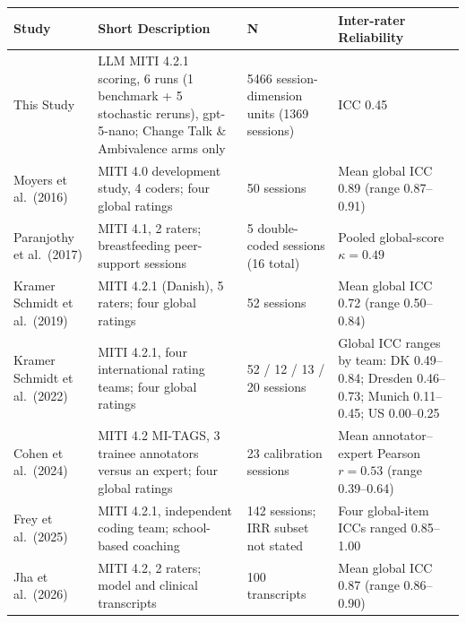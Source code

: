 \begin{tabular}{p{3.2cm} p{5.4cm} p{3.0cm} p{4.4cm}}
\toprule
\textbf{Study} & \textbf{Short Description} & \textbf{N} & \textbf{Inter-rater Reliability} \\
\midrule
This Study & LLM MITI 4.2.1 scoring, 6 runs (1 benchmark + 5 stochastic reruns), gpt-5-nano; Change Talk \& Ambivalence arms only & 5466 session-dimension units (1369 sessions) & ICC 0.45 \\
\midrule
Moyers et al.\ (2016) & MITI 4.0 development study, 4 coders; four global ratings & 50 sessions & Mean global ICC 0.89 (range 0.87--0.91) \\
Paranjothy et al.\ (2017) & MITI 4.1, 2 raters; breastfeeding peer-support sessions & 5 double-coded sessions (16 total) & Pooled global-score $\kappa=0.49$ \\
Kramer Schmidt et al.\ (2019) & MITI 4.2.1 (Danish), 5 raters; four global ratings & 52 sessions & Mean global ICC 0.72 (range 0.50--0.84) \\
Kramer Schmidt et al.\ (2022) & MITI 4.2.1, four international rating teams; four global ratings & 52 / 12 / 13 / 20 sessions & Global ICC ranges by team: DK 0.49--0.84; Dresden 0.46--0.73; Munich 0.11--0.45; US 0.00--0.25 \\
Cohen et al.\ (2024) & MITI 4.2 MI-TAGS, 3 trainee annotators versus an expert; four global ratings & 23 calibration sessions & Mean annotator--expert Pearson $r=0.53$ (range 0.39--0.64) \\
Frey et al.\ (2025) & MITI 4.2.1, independent coding team; school-based coaching & 142 sessions; IRR subset not stated & Four global-item ICCs ranged 0.85--1.00 \\
Jha et al.\ (2026) & MITI 4.2, 2 raters; model and clinical transcripts & 100 transcripts & Mean global ICC 0.87 (range 0.86--0.90) \\
\bottomrule
\end{tabular}
\par\smallskip
